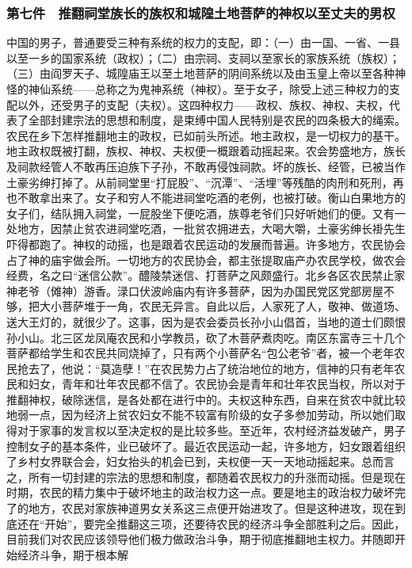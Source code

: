 \documentclass[cn,11pt,chinese]{elegantbook}
\def\myformat#1{\hfil\hfil #1}
\begin{document}
\subsubsection*{\myformat{第七件　推翻祠堂族长的族权和城隍土地菩萨的神权以至丈夫的男权}}
中国的男子，普通要受三种有系统的权力的支配，即：（一）由一国、一省、一县以至一乡的国家系统（政权）；（二）由宗祠、支祠以至家长的家族系统（族权）；（三）由阎罗天子、城隍庙王以至土地菩萨的阴间系统以及由玉皇上帝以至各种神怪的神仙系统——总称之为鬼神系统（神权）。至于女子，除受上述三种权力的支配以外，还受男子的支配（夫权）。这四种权力——政权、族权、神权、夫权，代表了全部封建宗法的思想和制度，是束缚中国人民特别是农民的四条极大的绳索。农民在乡下怎样推翻地主的政权，已如前头所述。地主政权，是一切权力的基干。地主政权既被打翻，族权、神权、夫权便一概跟着动摇起来。农会势盛地方，族长及祠款经管人不敢再压迫族下子孙，不敢再侵蚀祠款。坏的族长、经管，已被当作土豪劣绅打掉了。从前祠堂里“打屁股”、“沉潭”、“活埋”等残酷的肉刑和死刑，再也不敢拿出来了。女子和穷人不能进祠堂吃酒的老例，也被打破。衡山白果地方的女子们，结队拥入祠堂，一屁股坐下便吃酒，族尊老爷们只好听她们的便。又有一处地方，因禁止贫农进祠堂吃酒，一批贫农拥进去，大喝大嚼，土豪劣绅长褂先生吓得都跑了。神权的动摇，也是跟着农民运动的发展而普遍。许多地方，农民协会占了神的庙宇做会所。一切地方的农民协会，都主张提取庙产办农民学校，做农会经费，名之曰“迷信公款”。醴陵禁迷信、打菩萨之风颇盛行。北乡各区农民禁止家神老爷（傩神）游香。渌口伏波岭庙内有许多菩萨，因为办国民党区党部房屋不够，把大小菩萨堆于一角，农民无异言。自此以后，人家死了人，敬神、做道场、送大王灯的，就很少了。这事，因为是农会委员长孙小山倡首，当地的道士们颇恨孙小山。北三区龙凤庵农民和小学教员，砍了木菩萨煮肉吃。南区东富寺三十几个菩萨都给学生和农民共同烧掉了，只有两个小菩萨名“包公老爷”者，被一个老年农民抢去了，他说：“莫造孽！”在农民势力占了统治地位的地方，信神的只有老年农民和妇女，青年和壮年农民都不信了。农民协会是青年和壮年农民当权，所以对于推翻神权，破除迷信，是各处都在进行中的。夫权这种东西，自来在贫农中就比较地弱一点，因为经济上贫农妇女不能不较富有阶级的女子多参加劳动，所以她们取得对于家事的发言权以至决定权的是比较多些。至近年，农村经济益发破产，男子控制女子的基本条件，业已破坏了。最近农民运动一起，许多地方，妇女跟着组织了乡村女界联合会，妇女抬头的机会已到，夫权便一天一天地动摇起来。总而言之，所有一切封建的宗法的思想和制度，都随着农民权力的升涨而动摇。但是现在时期，农民的精力集中于破坏地主的政治权力这一点。要是地主的政治权力破坏完了的地方，农民对家族神道男女关系这三点便开始进攻了。但是这种进攻，现在到底还在“开始”，要完全推翻这三项，还要待农民的经济斗争全部胜利之后。因此，目前我们对农民应该领导他们极力做政治斗争，期于彻底推翻地主权力。并随即开始经济斗争，期于根本解
\end{document}
